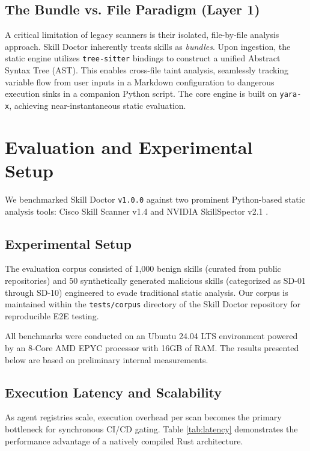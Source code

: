 \documentclass[11pt,letterpaper]{article}
\begin{document}
\subsection{The Bundle vs. File Paradigm (Layer 1)}

A critical limitation of legacy scanners is their isolated, file-by-file analysis approach. Skill Doctor inherently treats skills as \textit{bundles}. Upon ingestion, the static engine utilizes \texttt{tree-sitter} bindings to construct a unified Abstract Syntax Tree (AST). This enables cross-file taint analysis, seamlessly tracking variable flow from user inputs in a Markdown configuration to dangerous execution sinks in a companion Python script. The core engine is built on \texttt{yara-x}, achieving near-instantaneous static evaluation.

\section{Evaluation and Experimental Setup}

We benchmarked Skill Doctor \texttt{v1.0.0} against two prominent Python-based static analysis tools: Cisco Skill Scanner v1.4 \cite{cisco2026} and NVIDIA SkillSpector v2.1 \cite{nvidia2026}.

\subsection{Experimental Setup}

The evaluation corpus consisted of 1,000 benign skills (curated from public repositories) and 50 synthetically generated malicious skills (categorized as SD-01 through SD-10) engineered to evade traditional static analysis. Our corpus is maintained within the \texttt{tests/corpus} directory of the Skill Doctor repository for reproducible E2E testing. 

All benchmarks were conducted on an Ubuntu 24.04 LTS environment powered by an 8-Core AMD EPYC processor with 16GB of RAM. The results presented below are based on preliminary internal measurements.

\subsection{Execution Latency and Scalability}

As agent registries scale, execution overhead per scan becomes the primary bottleneck for synchronous CI/CD gating. Table \ref{tab:latency} demonstrates the performance advantage of a natively compiled Rust architecture.
\end{document}
